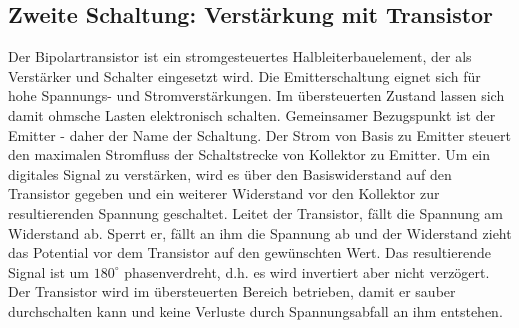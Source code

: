 \subsection{Zweite Schaltung: Verstärkung mit Transistor} \label{schaltung:transistor}
Der Bipolartransistor ist ein stromgesteuertes Halbleiterbauelement, der als Verstärker und Schalter eingesetzt wird. Die Emitterschaltung eignet sich für hohe Spannungs- und Stromverstärkungen. Im übersteuerten Zustand lassen sich damit ohmsche Lasten elektronisch schalten. Gemeinsamer Bezugspunkt ist der Emitter - daher der Name der Schaltung. Der Strom von Basis zu Emitter steuert den maximalen Stromfluss der Schaltstrecke von Kollektor zu Emitter. Um ein digitales Signal zu verstärken, wird es über den Basiswiderstand auf den Transistor gegeben und ein weiterer Widerstand vor den Kollektor zur resultierenden Spannung geschaltet. Leitet der Transistor, fällt die Spannung am Widerstand ab. Sperrt er, fällt an ihm die Spannung ab und der Widerstand zieht das Potential vor dem Transistor auf den gewünschten Wert. Das resultierende Signal ist um $180^\circ$ phasenverdreht, d.h. es wird invertiert aber nicht verzögert. Der Transistor wird im übersteuerten Bereich betrieben, damit er sauber durchschalten kann und keine Verluste durch Spannungsabfall an ihm entstehen. \cite{web:transe}\\


